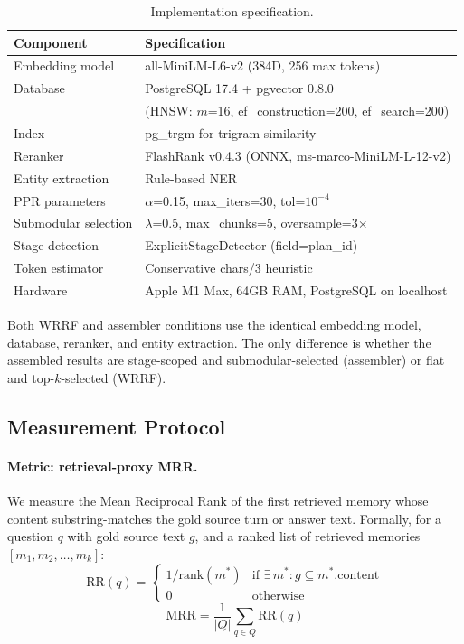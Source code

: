 \documentclass[11pt]{article}
\begin{document}
\begin{table}[h]
\centering
\caption{Implementation specification.}
\label{tab:impl}
\small
\begin{tabular}{ll}
\toprule
Component & Specification \\
\midrule
Embedding model & all-MiniLM-L6-v2 (384D, 256 max tokens) \\
Database & PostgreSQL 17.4 + pgvector 0.8.0 \\
 & (HNSW: $m$=16, ef\_construction=200, ef\_search=200) \\
Index & pg\_trgm for trigram similarity \\
Reranker & FlashRank v0.4.3 (ONNX, ms-marco-MiniLM-L-12-v2) \\
Entity extraction & Rule-based NER \\
PPR parameters & $\alpha$=0.15, max\_iters=30, tol=$10^{-4}$ \\
Submodular selection & $\lambda$=0.5, max\_chunks=5, oversample=3$\times$ \\
Stage detection & ExplicitStageDetector (field=plan\_id) \\
Token estimator & Conservative chars/3 heuristic \\
Hardware & Apple M1 Max, 64GB RAM, PostgreSQL on localhost \\
\bottomrule
\end{tabular}
\end{table}

Both WRRF and assembler conditions use the identical embedding model,
database, reranker, and entity extraction.  The only difference is
whether the assembled results are stage-scoped and
submodular-selected (assembler) or flat and top-$k$-selected (WRRF).

\subsection{Measurement Protocol}
\label{sec:measurement}

\paragraph{Metric: retrieval-proxy MRR.}
We measure the Mean Reciprocal Rank of the first retrieved memory
whose content substring-matches the gold source turn or answer text.
Formally, for a question $q$ with gold source text $g$, and a ranked
list of retrieved memories $[m_1, m_2, \ldots, m_k]$:
\begin{equation}
\text{RR}(q) =
\begin{cases}
1/\text{rank}(m^*) & \text{if } \exists\, m^* : g \subseteq m^*.\text{content} \\
0 & \text{otherwise}
\end{cases}
\label{eq:rr}
\end{equation}
\begin{equation}
\text{MRR} = \frac{1}{|Q|} \sum_{q \in Q} \text{RR}(q)
\label{eq:mrr}
\end{equation}
\end{document}
